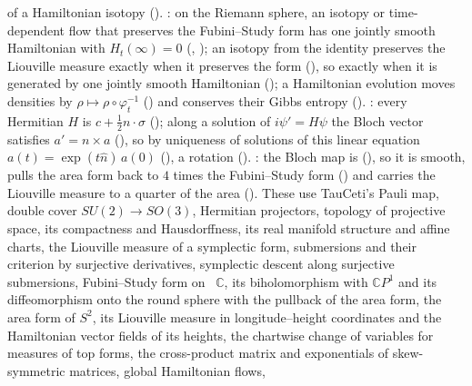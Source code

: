 \documentclass[11pt]{article}
\begin{document}
\begin{itemize}
  of a Hamiltonian isotopy ().\newline
  : on the Riemann sphere, an isotopy or time-dependent flow that
  preserves the Fubini--Study form has one jointly smooth Hamiltonian with $H_t(\infty) = 0$
  (,
  ); an isotopy from the identity preserves
  the Liouville measure exactly when it preserves the form
  (), so exactly when it is generated by one jointly
  smooth Hamiltonian (); a Hamiltonian
  evolution moves densities by $\rho \mapsto \rho \circ \varphi_t^{-1}$
  () and conserves their Gibbs entropy
  ().\newline
  : every Hermitian $H$ is $c + \frac12 n\cdot\sigma$
  (); along a solution of $i\psi' = H\psi$ the Bloch vector
  satisfies $a' = n \times a$ (), so by uniqueness of solutions of
  this linear equation $a(t) = \exp(t\hat n)\,a(0)$ (), a rotation
  ().\newline
  : the Bloch map is 
  (), so it is smooth, pulls the area form back to $4$
  times the Fubini--Study form () and carries the
  Liouville measure to a quarter of the area ().\newline
  These use TauCeti's Pauli map, double cover $SU(2) \to SO(3)$, Hermitian projectors, topology of
  projective space, its compactness and Hausdorffness, its real manifold structure and affine
  charts, the Liouville measure of a symplectic form, submersions and their
  criterion by surjective derivatives, symplectic descent along surjective submersions,
  Fubini--Study form on ~$\mathbb C$, its biholomorphism with $\mathbb CP^1$ and its
  diffeomorphism onto the round sphere with the pullback of the area form, the area form of $S^2$,
  its Liouville measure in longitude--height coordinates and the Hamiltonian vector fields of its
  heights, the chartwise change of variables for measures of top forms, the cross-product matrix
  and exponentials of skew-symmetric matrices, global Hamiltonian flows,

\end{itemize}
\end{document}
